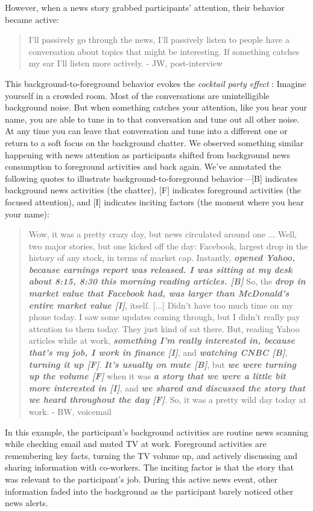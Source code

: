 \documentclass[sigchi]{acmart}
\begin{document}
However, when a news story grabbed participants’ attention, their behavior became active: 
\begin{quote}
I’ll passively go through the news, I’ll passively listen to people have a conversation about topics that might be interesting. If something catches my ear I’ll listen more actively. - JW, post-interview
\end{quote}
This background-to-foreground behavior evokes the \textit{cocktail party effect} \cite{arons1992review}: Imagine yourself in a crowded room. Most of the conversations are unintelligible background noise. But when something catches your attention, like you hear your name, you are able to tune in to that conversation and tune out all other noise. At any time you can leave that conversation and tune into a different one or return to a soft focus on the background chatter. We observed something similar happening with news attention as participants shifted from background news consumption to foreground activities and back again. We’ve annotated the following quotes to illustrate background-to-foreground behavior—[B] indicates background news activities (the chatter), [F] indicates foreground activities (the focused attention), and [I] indicates inciting factors (the moment where you hear your name):
\begin{quote}
Wow, it was a pretty crazy day, but news circulated around one ... Well, two major stories, but one kicked off the day: Facebook, largest drop in the history of any stock, in terms of market cap. Instantly, \textbf{\textit{opened Yahoo, because earnings report was released. I was sitting at my desk about 8:15, 8:30 this morning reading articles. [B]}} So, the \textbf{\textit{drop in market value that Facebook had, was larger than McDonald’s entire market value [I]}}, itself. [...] Didn’t have too much time on my phone today. I saw some updates coming through, but I didn’t really pay attention to them today. They just kind of sat there. But, reading Yahoo articles while at work, \textbf{\textit{something I’m really interested in, because that’s my job, I work in finance [I]}}, and \textit{\textbf{watching CNBC [B]}},\textbf{\textit{ turning it up [F]}}. \textbf{\textit{It’s usually on mute [B]}}, but \textit{\textbf{we were turning up the volume [F]}} when it was \textit{\textbf{a story that we were a little bit more interested in [I]}}, and \textbf{\textit{we shared and discussed the story that we heard throughout the day [F]}}. So, it was a pretty wild day today at work. - BW, voicemail
\end{quote}
In this example, the participant’s background activities are routine news scanning while checking email and muted TV at work. Foreground activities are remembering key facts, turning the TV volume up, and actively discussing and sharing information with co-workers. The inciting factor is that the story that was relevant to the participant's job. During this active news event, other information faded into the background as the participant barely noticed other news alerts.
\end{document}
